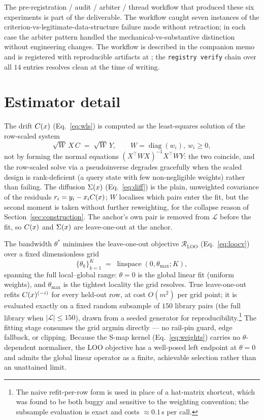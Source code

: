 The pre-registration / audit / arbiter / thread workflow that
produced these six experiments is part of the deliverable. The
workflow caught seven instances of the
criterion-vs-legitimate-data-structure failure mode without
retraction; in each case the arbiter pattern handled the
mechanical-vs-substantive distinction without engineering changes.
The workflow is described in the companion memo and is registered
with reproducible artifacts at
; the
\verb|registry verify| chain over all $14$ entries resolves clean
at the time of writing.

\appendix

\section{Estimator detail}
\label{app:estimator}

The drift \(C(x)\) (Eq.~\ref{eq:wls}) is computed as the least-squares
solution of the row-scaled system
\begin{equation}
\label{eq:rowscale}
\sqrt{W}\,X\,C \;=\; \sqrt{W}\,Y,
\qquad W = \operatorname{diag}(w_i),\ w_i \ge 0,
\end{equation}
not by forming the normal equations \((X^{\top}WX)^{-1}X^{\top}WY\):
the two coincide, and the row-scaled solve via a pseudoinverse
degrades gracefully when the scaled design is rank-deficient (a query
state with few non-negligible weights) rather than failing. The
diffusion \(\Sigma(x)\) (Eq.~\ref{eq:diff}) is the plain, unweighted
covariance of the residuals \(r_i = y_i - x_iC(x)\); \(W\) localises
which pairs enter the fit, but the second moment is taken without
further reweighting, for the collapse reason of
Section~\ref{sec:construction}. The anchor's own pair is removed from
\(\mathcal{L}\) before the fit, so \(C(x)\) and \(\Sigma(x)\) are
leave-one-out at the anchor.

The bandwidth \(\theta^{*}\) minimises the leave-one-out objective
\(\mathcal{R}_{\mathrm{LOO}}\) (Eq.~\ref{eq:loocv}) over a fixed
dimensionless grid
\begin{equation}
\label{eq:thetagrid}
\{\theta_k\}_{k=1}^{K}
\;=\; \operatorname{linspace}(0, \theta_{\max}; K),
\end{equation}
spanning the full local--global range: \(\theta = 0\) is the global
linear fit (uniform weights), and \(\theta_{\max}\) is the tightest
locality the grid resolves. True leave-one-out refits \(C(x)^{(-i)}\)
for every held-out row, at cost \(O(m^{2})\) per grid point; it is
evaluated exactly on a fixed random subsample of \(150\) library
pairs (the full library when \(|\mathcal{L}| \le 150\)), drawn from a
seeded generator for reproducibility.\footnote{The naive
refit-per-row form is used in place of a hat-matrix shortcut, which
was found to be both buggy and sensitive to the weighting convention;
the subsample evaluation is exact and costs \(\approx 0.1\,\)s per
call.} The fitting stage consumes the grid argmin directly --- no
rail-pin guard, edge fallback, or clipping. Because the S-map kernel
(Eq.~\ref{eq:weights}) carries no \(\theta\)-dependent normaliser,
the LOO objective has a well-posed left endpoint at \(\theta = 0\)
and admits the global linear operator as a finite, achievable
selection rather than an unattained limit.

